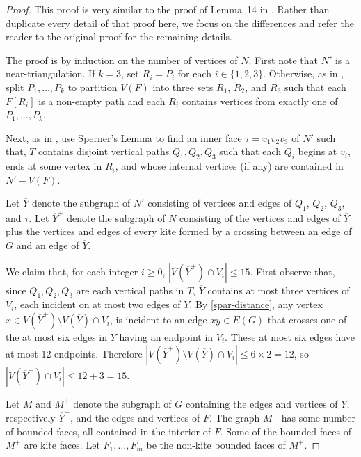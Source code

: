 \documentclass{patmorin}
\renewcommand{\ge}{\geqslant}
\renewcommand{\le}{\leqslant}
\begin{document}
\begin{proof}
  This proof is very similar to the proof of Lemma~14 in \citet{dujmovic.joret.ea:planar}. Rather than duplicate every detail of that proof here, we focus on the differences and refer the reader to the original proof for the remaining details.
  
  The proof is by induction on the number of vertices of $N$.
  First note that $N'$ is a near-triangulation.  If $k=3$, set $R_i=P_i$ for each $i\in\{1,2,3\}$.  Otherwise, as in \citet{dujmovic.joret.ea:planar}, split $P_1,\ldots,P_k$ to partition $V(F)$ into three sets $R_1$, $R_2$, and $R_3$ such that each $F[R_i]$ is a non-empty path and each $R_i$ contains vertices from exactly one of $P_1,\ldots,P_k$. 
  
  Next, as in \citet{dujmovic.joret.ea:planar}, use Sperner's Lemma to find an inner face $\tau=v_1v_2v_3$ of $N'$ such that, $T$ contains disjoint vertical paths $Q_1,Q_2,Q_3$ such that each $Q_i$ begins at $v_i$, ends at some vertex in $R_i$, and whose internal vertices (if any) are contained in $N'-V(F)$.
  
  Let $\overline{Y}$ denote the subgraph of $N'$ consisting of vertices and edges of $Q_1$, $Q_2$, $Q_3$, and $\tau$.  Let $\overline{Y}^+$ denote the subgraph of $N$ consisting of the vertices and edges of $\overline{Y}$ plus the vertices and edges of every kite formed by a crossing between an edge of $G$ and an edge of $\overline{Y}$.
  
  We claim that, for each integer $i\ge 0$, $|V(\overline{Y}^+)\cap V_i|\le 15$.  First observe that, since $Q_1,Q_2,Q_3$ are each vertical paths in $T$,  $\overline{Y}$ contains at most three vertices of $V_i$, each incident on at most two edges of $\overline{Y}$.  By \eqref{spar-distance}, any vertex $x\in V(\overline{Y}^+)\setminus V(\overline{Y})\cap V_i$, is incident to an edge $xy\in E(G)$ that crosses one of the at most six edges in $\overline{Y}$ having an endpoint in $V_i$.  These at most six edges have at most 12 endpoints.  Therefore $|V(\overline{Y}^+)\setminus V(\overline{Y})\cap V_i|\le 6\times 2=12$, so $|V(\overline{Y}^+)\cap V_i|\le 12+3=15$.
  
  Let $M$ and $M^+$ denote the subgraph of $G$ containing the edges and vertices of $\overline{Y}$, respectively $\overline{Y}^+$, and the edges and vertices of $F$.  The graph $M^+$ has some number of bounded faces, all contained in the interior of $F$. Some of the bounded faces of $M^+$ are kite faces. Let $F_1,\ldots,F_m$ be the non-kite bounded faces of $M^+$.  
  

\end{proof}
\end{document}
